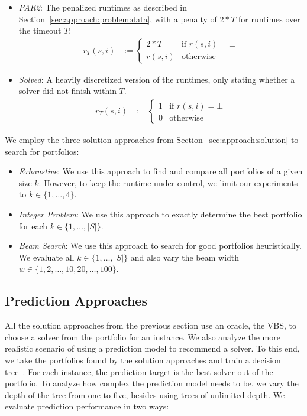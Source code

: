 \documentclass[conference]{IEEEtran}
\begin{document}
\begin{itemize}
	\item \emph{PAR2}:
	The penalized runtimes as described in Section~\ref{sec:approach:problem:data}, with a penalty of $2*T$ for runtimes over the timeout $T$:
	\begin{align*}
		r_T(s,i) &:= \begin{cases}
			2*T & \text{if }r(s,i) = \bot\\
			r(s,i) & \text{otherwise}
		\end{cases}
	\end{align*}
	\item \emph{Solved}:
	A heavily discretized version of the runtimes, only stating whether a solver did not finish within $T$.
	\begin{align*}
		r_T(s,i) &:= \begin{cases}
			1 & \text{if }r(s,i) = \bot\\
			0 & \text{otherwise}
		\end{cases}
	\end{align*}
\end{itemize}

We employ the three solution approaches from Section~\ref{sec:approach:solution} to search for portfolios:

\begin{itemize}
	\item \emph{Exhaustive}:
	We use this approach to find and compare all portfolios of a given size $k$.
	However, to keep the runtime under control, we limit our experiments to $k \in \{1, \dots, 4\}$.
	\item \emph{Integer Problem}:
	We use this approach to exactly determine the best portfolio for each $k \in \{1, \dots, |S|\}$.
	\item \emph{Beam Search}:
	We use this approach to search for good portfolios heuristically.
	We evaluate all $k \in \{1, \dots, |S|\}$ and also vary the beam width $w \in \{1, 2, \dots, 10, 20, \dots, 100\}$.
\end{itemize}

\subsection{Prediction Approaches}

All the solution approaches from the previous section use an oracle, the VBS, to choose a solver from the portfolio for an instance.
We also analyze the more realistic scenario of using a prediction model to recommend a solver.
To this end, we take the portfolios found by the solution approaches and train a decision tree~\cite{breiman1984classification}.
For each instance, the prediction target is the best solver out of the portfolio.
To analyze how complex the prediction model needs to be, we vary the depth of the tree from one to five, besides using trees of unlimited depth.
We evaluate prediction performance in two ways:
\end{document}
